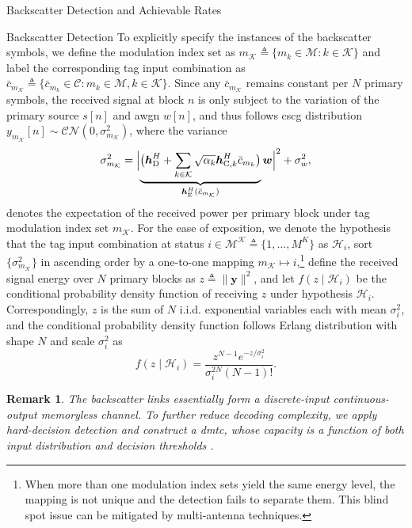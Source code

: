 \documentclass[journal]{IEEEtran}
\newtheorem{remark}{Remark}
\begin{document}
\begin{section}{Backscatter Detection and Achievable Rates}
\begin{subsection}{Backscatter Detection}
			To explicitly specify the instances of the backscatter symbols, we define the modulation index set as $m_{\mathcal{K}} \triangleq \{m_k \in \mathcal{M} : k \in \mathcal{K}\}$ and label the corresponding tag input combination as $\bar{c}_{m_{\mathcal{K}}} \triangleq \{\bar{c}_{m_k} \in \mathcal{C} : m_k \in \mathcal{M}, k \in \mathcal{K}\}$. Since any $\bar{c}_{m_{\mathcal{K}}}$ remains constant per $N$ primary symbols, the received signal at block $n$ is only subject to the variation of the primary source $s[n]$ and \gls{awgn} $w[n]$, and thus follows \gls{cscg} distribution $y_{m_{\mathcal{K}}}[n] \sim \mathcal{CN}\left(0,\sigma_{m_{\mathcal{K}}}^2\right)$, where the variance
			\begin{equation}
				\sigma_{m_{\mathcal{K}}}^2 = \Bigl\lvert \underbrace{\bigl(\boldsymbol{h}_{\mathrm{D}}^H + \sum_{k \in \mathcal{K}} \sqrt{\alpha_k} \boldsymbol{h}_{\mathrm{C},k}^H \bar{c}_{m_k}\bigr)}_{\boldsymbol{h}_{\mathrm{E}}^H(\bar{c}_{m_{\mathcal{K}}})} \boldsymbol{w} \Bigr\rvert^2 + \sigma_w^2,
				\label{eq:receive_variance}
			\end{equation}
			denotes the expectation of the received power per primary block under tag modulation index set $m_{\mathcal{K}}$. For the ease of exposition, we denote the hypothesis that the tag input combination at status $i \in \mathcal{M^K} \triangleq \{1,\ldots,M^K\}$ as $\mathcal{H}_i$, sort $\{\sigma_{m_{\mathcal{K}}}^2\}$ in ascending order by a one-to-one mapping $m_{\mathcal{K}} \mapsto i$,\footnote{When more than one modulation index sets yield the same energy level, the mapping is not unique and the detection fails to separate them. This blind spot issue can be mitigated by multi-antenna techniques.} define the received signal energy over $N$ primary blocks as $z \triangleq \lVert \boldsymbol{y} \rVert^2$, and let $f(z \mid \mathcal{H}_i)$ be the conditional probability density function of receiving $z$ under hypothesis $\mathcal{H}_i$. Correspondingly, $z$ is the sum of $N$ i.i.d. exponential variables each with mean $\sigma_i^2$, and the conditional probability density function follows Erlang distribution with shape $N$ and scale $\sigma_i^2$ as
			\begin{equation}
				f(z \mid \mathcal{H}_i) = \frac{z^{N-1} e^{-z/\sigma_i^2}}{\sigma_i^{2N} (N-1)!}.
				\label{eq:energy_distribution}
			\end{equation}

			\begin{remark}
				The backscatter links essentially form a discrete-input continuous-output memoryless channel. To further reduce decoding complexity, we apply hard-decision detection and construct a \gls{dmtc}, whose capacity is a function of both input distribution and decision thresholds \cite{Nguyen2018}.
			\end{remark}


\end{subsection}
\end{section}
\end{document}
